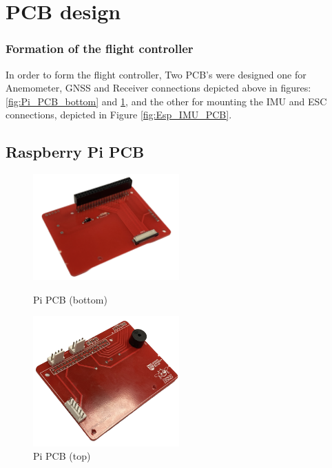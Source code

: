\documentclass{report}
\begin{document}
\section{PCB design}\label{PCB_section}
\subsubsection*{Formation of the flight controller}
In order to form the flight controller, Two PCB's were designed one for
Anemometer, GNSS and Receiver connections depicted above in
figures:\ref{fig:Pi_PCB_bottom} and \ref{fig:Pi_PCB_top}, and the other for
mounting the IMU and ESC connections, depicted in Figure \ref{fig:Esp_IMU_PCB}.
\subsection{Raspberry Pi PCB}
\begin{figure}[H]
  \begin{minipage}{0.5\textwidth}
    \centering
    \includegraphics[width=0.5\textwidth]{Pictures/Pi_PCB_bottom.png}
    \caption{Pi PCB (bottom)}
    \label{fig:Pi_PCB_bottom}
  \end{minipage}
  \begin{minipage}{0.5\textwidth}
    \centering
    \includegraphics[width=0.5\textwidth]{Pictures/Pi_PCB_top.png}
    \caption{Pi PCB (top)}
    \label{fig:Pi_PCB_top}
  \end{minipage}
\end{figure}
\end{document}
